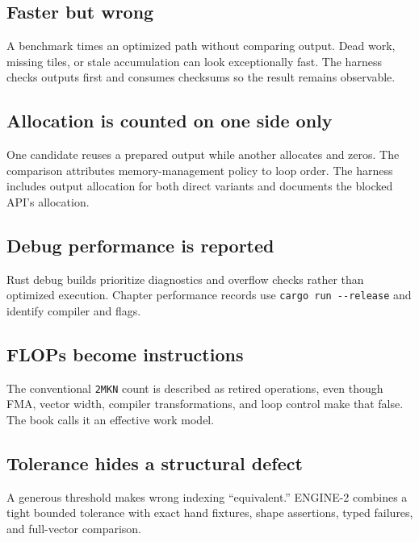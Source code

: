 \subsection{Faster but wrong}\label{faster-but-wrong}

A benchmark times an optimized path without comparing output. Dead work,
missing tiles, or stale accumulation can look exceptionally fast. The
harness checks outputs first and consumes checksums so the result
remains observable.

\subsection{Allocation is counted on one side
only}\label{allocation-is-counted-on-one-side-only}

One candidate reuses a prepared output while another allocates and
zeros. The comparison attributes memory-management policy to loop order.
The  harness includes output allocation for both direct
variants and documents the blocked API's allocation.

\subsection{Debug performance is
reported}\label{debug-performance-is-reported}

Rust debug builds prioritize diagnostics and overflow checks rather than
optimized execution. Chapter performance records use
\texttt{cargo\ run\ -\/-release} and identify compiler and flags.

\subsection{FLOPs become
instructions}\label{flops-become-instructions}

The conventional \texttt{2MKN} count is described as retired operations,
even though FMA, vector width, compiler transformations, and loop
control make that false. The book calls it an effective work model.

\subsection{Tolerance hides a structural
defect}\label{tolerance-hides-a-structural-defect}

A generous threshold makes wrong indexing ``equivalent.'' ENGINE-2
combines a tight bounded tolerance with exact hand fixtures, shape
assertions, typed failures, and full-vector comparison.

